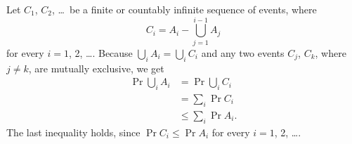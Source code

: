 Let $C_1$, $C_2$, \dots\ be a finite or countably infinite sequence of events, where
\[
    C_i = A_i-\bigcup_{j=1}^{i-1}A_j
\]
for every $i=1$, 2, \dots.
Because $\bigcup_iA_i=\bigcup_iC_i$ and any two events $C_j$, $C_k$, where $j\ne k$, are mutually exclusive, we get
\begin{align*}
    \Pr{\bigcup_iA_i} &= \Pr{\bigcup_iC_i} \\
    &= \sum_i\Pr{C_i} \\
    &\le \sum_i\Pr{A_i}.
\end{align*}
The last inequality holds, since $\Pr{C_i}\le\Pr{A_i}$ for every $i=1$, 2, \dots.
